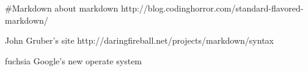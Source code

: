 #Markdown
about markdown
http://blog.codinghorror.com/standard-flavored-markdown/

John Gruber's site
http://daringfireball.net/projects/markdown/syntax

fuchsia Google's new operate system
